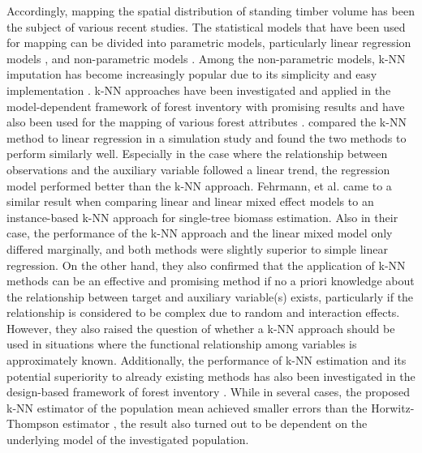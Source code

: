 Accordingly, mapping the spatial distribution of standing timber volume has been the subject of various recent studies. The statistical models that have been used for mapping can be divided into parametric models, particularly linear regression models \citep{tonolli2011, vanaardt2008}, and non-parametric models \citep{franco2001, latifi2010, nothdurft2009}. Among the non-parametric models, k-NN imputation has become increasingly popular due to its simplicity and easy implementation \citep{magnussen2014}. k-NN approaches have been investigated and applied in the model-dependent framework of forest inventory with promising results \citep{mcroberts2007} and have also been used for the mapping of various forest attributes \citep{beaudoin2014, chirici2012, tomppo2006}. \citet{haara2012} compared the k-NN method to linear regression in a simulation study and found the two methods to perform similarly well. Especially in the case where the relationship between observations and the auxiliary variable followed a linear trend, the regression model performed better than the k-NN approach. Fehrmann, et al. \citep{fehrmann2008} came to a similar result when comparing linear and linear mixed effect models to an instance-based k-NN approach for single-tree biomass estimation. Also in their case, the performance of the k-NN approach and the linear mixed model only differed marginally, and both methods were slightly superior to simple linear regression. On the other hand, they also confirmed that the application of k-NN methods can be an effective and promising method if no a priori knowledge about the relationship between target and auxiliary variable(s) exists, particularly if the relationship is considered to be complex due to random and interaction effects. However, they also raised the question of whether a k-NN approach should be used in situations where the functional relationship among variables is approximately known. Additionally, the performance of k-NN estimation and its potential superiority to already existing methods has also been investigated in the design-based framework of forest inventory \citep{baffetta2010, baffetta2009}. While in several cases, the proposed k-NN estimator of the population mean achieved smaller errors than the Horwitz-Thompson estimator \citep{mandallaz2008}, the result also turned out to be dependent on the underlying model of the investigated population.\par
